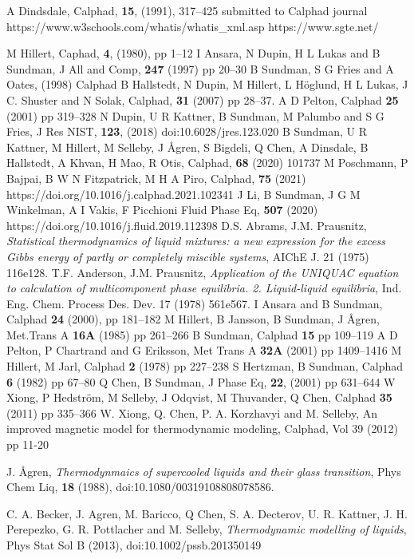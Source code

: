 \documentclass{article}
\begin{document}
\begin{thebibliography}{00Zzzz}
 A Dindsdale, Calphad, {\bf 15}, (1991), 317--425
 submitted to Calphad journal
 https://www.w3schools.com/whatis/whatis\_xml.asp
 https://www.sgte.net/

 M Hillert,  Caphad, {\bf 4}, (1980), pp 1--12
 I Ansara, N Dupin, H L Lukas and B Sundman,
  J All and Comp, {\bf 247} (1997) pp 20--30
 B Sundman, S G Fries and A Oates, (1998) Calphad
 B Hallstedt, N Dupin, M Hillert, L H{\"o}glund, H L
  Lukas, J C. Shuster and N Solak, Calphad, {\bf 31} (2007) pp 28--37.
 A D Pelton, Calphad {\bf 25} (2001) pp 319--328
 N Dupin, U R Kattner, B Sundman, M
  Palumbo and S G Fries, J Res NIST, {\bf 123}, (2018)
  doi:10.6028/jres.123.020
 B Sundman, U R Kattner, M Hillert, M Selleby, J
  {\AA}gren, S Bigdeli, Q Chen, A Dinsdale, B Hallstedt, A Khvan, H
  Mao, R Otis, Calphad, {\bf 68} (2020) 101737
 M Poschmann, P Bajpai, B W N Fitzpatrick, M H A Piro,
  Calphad, {\bf 75} (2021) https://doi.org/10.1016/j.calphad.2021.102341
 J Li, B Sundman, J G M Winkelman, A I Vakis, F
  Picchioni Fluid Phase Eq, {\bf 507} (2020)
  https://doi.org/10.1016/j.fluid.2019.112398
 D.S. Abrams, J.M. Prausnitz, {\em Statistical
  thermodynamics of liquid mixtures: a new expression for the excess
  Gibbs energy of partly or completely miscible systems}, AIChE J. 21
  (1975) 116e128.
 T.F. Anderson, J.M. Prausnitz, {\em Application of the
  UNIQUAC equation to calculation of multicomponent phase
  equilibria. 2. Liquid-liquid equilibria}, Ind.  Eng. Chem. Process
  Des. Dev. 17 (1978) 561e567.
 I Ansara and B Sundman, Calphad {\bf 24} (2000), pp
  181--182
 M Hillert, B Jansson, B Sundman, J {\AA}gren,
  Met.Trans A {\bf 16A} (1985) pp 261--266
 B Sundman, Calphad {\bf 15} pp 109--119
 A D Pelton, P Chartrand and G Eriksson,
  Met Trans A {\bf 32A} (2001) pp 1409--1416
 M Hillert, M Jarl, Calphad {\bf 2} (1978) pp 227--238
 S Hertzman, B Sundman, Calphad {\bf 6} (1982) pp 67--80
 Q Chen, B Sundman, J Phase Eq, {\bf 22}, (2001) pp 631--644
 W Xiong, P Hedstr{\"o}m, M Selleby, J Odqvist, M
  Thuvander, Q Chen, Calphad {\bf 35} (2011) pp 335--366
 W. Xiong, Q. Chen, P. A. Korzhavyi and M. Selleby, An
  improved magnetic model for thermodynamic modeling, Calphad, Vol 39
  (2012) pp 11-20

 J. {\AA}gren, {\em Thermodynmaics of supercooled
  liquids and their glass transition}, Phys Chem Liq, {\bf 18} (1988),
  doi:10.1080/00319108808078586.

 C. A. Becker, J. Agren, M. Baricco, Q Chen,
  S. A. Decterov, U. R. Kattner, J. H. Perepezko, G. R. Pottlacher and
  M. Selleby, {\em Thermodynamic modelling of liquids}, Phys Stat Sol B
  (2013), doi:10.1002/pssb.201350149
\end{thebibliography}
\end{document}
